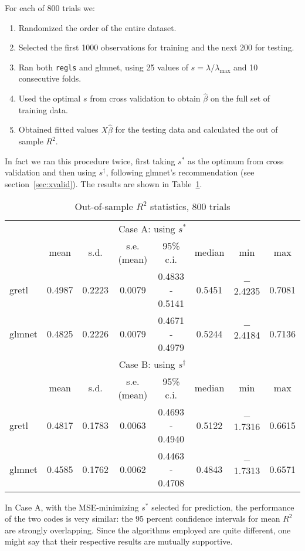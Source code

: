 \documentclass{article}
\begin{document}
For each of 800 trials we:
\begin{enumerate}
\item Randomized the order of the entire dataset.
\item Selected the first 1000 observations for training and the next
  200 for testing.
\item Ran both \texttt{regls} and \textsf{glmnet}, using 25 values
  of $s = \lambda/\lambda_{\max}$ and 10 consecutive folds.
\item Used the optimal $s$ from cross validation to obtain
  $\hat{\beta}$ on the full set of training data.
\item Obtained fitted values $X\hat{\beta}$ for the testing data and
  calculated the out of sample $R^2$.
\end{enumerate}

In fact we ran this procedure twice, first taking $s^*$ as the optimum
from cross validation and then using $s^{\dagger}$, following
\textsf{glmnet}'s recommendation (see section~\ref{sec:xvalid}). The
results are shown in Table~\ref{tab:bigtest}.

\begin{table}[htbp]
  \centering
  \begin{tabular}{lccccccc}
    \multicolumn{8}{c}{Case A: using $s^*$} \\
 & mean & s.d. & s.e.(mean) & 95\% c.i. & median & min & max \\
\textsf{gretl} & 0.4987 & 0.2223 & 0.0079 & 0.4833 - 0.5141 & 0.5451 & $-$2.4235 & 0.7081 \\
\textsf{glmnet} & 0.4825 & 0.2226 & 0.0079 & 0.4671 - 0.4979 & 0.5244 & $-$2.4184 & 0.7136 \\[8pt]
    \multicolumn{8}{c}{Case B: using $s^{\dagger}$} \\
 & mean & s.d. & s.e.(mean) & 95\% c.i. & median & min & max \\
\textsf{gretl} & 0.4817 & 0.1783 & 0.0063 & 0.4693 - 0.4940 & 0.5122 & $-$1.7316 & 0.6615 \\
\textsf{glmnet} & 0.4585 & 0.1762 & 0.0062 & 0.4463 - 0.4708 & 0.4843 & $-$1.7313 & 0.6571 \\
  \end{tabular}
  \caption{Out-of-sample $R^2$ statistics, 800 trials}
  \label{tab:bigtest}
\end{table}

In Case A, with the MSE-minimizing $s^*$ selected for prediction, the
performance of the two codes is very similar: the 95 percent
confidence intervals for mean $R^2$ are strongly overlapping.  Since
the algorithms employed are quite different, one might say that their
respective results are mutually supportive.
\end{document}
